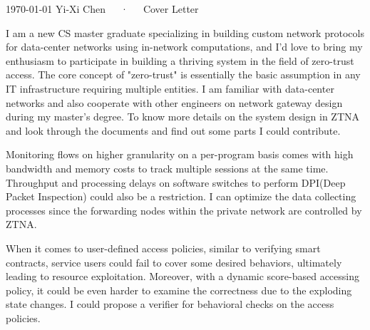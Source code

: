 \documentclass[11pt, a4paper]{awesome-cv}
\begin{document}
\makecvheader[L]

\makecvfooter
  {\today}
  {Yi-Xi Chen~~~·~~~Cover Letter}
  {}

\makelettertitle

\begin{cvletter}



\iffalse
I knew this job position from a senior engineer in Taiwan. Once upon I searched
the company, I was hooked by the slogan, "Solutions in Technology. Change in Action. Accessibility for All,"
which is short, clear, and powerful. I like to take on challenges, no matter new Technology,
hard issues, or complex questions, so the name of Hennge, the CHALLENGE, is
well-fitted my personality. I have been trained to be a careful researcher during
my master's program in NYCU, Taiwan, for studying the web application parallelism.
I also have software engineering internship experience and open source commitment experience,
where I learn all proficiencies for software engineering and soft skills in cooperation and communication.
I am curious about everything, and I want to get challenges at Hennge!
\fi

I am a new CS master graduate specializing in building custom network protocols for data-center networks using in-network computations, 
and I'd love to bring my enthusiasm to participate in building a thriving system in the field of zero-trust access. The core concept of "zero-trust" is 
essentially the basic assumption in any IT infrastructure requiring multiple entities. I am familiar with data-center networks and also cooperate 
with other engineers on network gateway design during my master's degree. To know more details on the system design in ZTNA and look through the documents and find out some parts I could contribute.

Monitoring flows on higher granularity on a per-program basis comes with high bandwidth and memory costs to track multiple sessions at the same time.
Throughput and processing delays on software switches to perform DPI(Deep Packet Inspection) could also be a restriction. I can optimize the data collecting 
processes since the forwarding nodes within the private network are controlled by ZTNA.

When it comes to user-defined access policies, similar to verifying smart contracts, service users could fail to cover some desired behaviors, ultimately leading to 
resource exploitation. Moreover, with a dynamic score-based accessing policy, it could be even harder to examine the correctness due to the exploding state changes.
I could propose a verifier for behavioral checks on the access policies.

\end{cvletter}


\makeletterclosing
\end{document}
